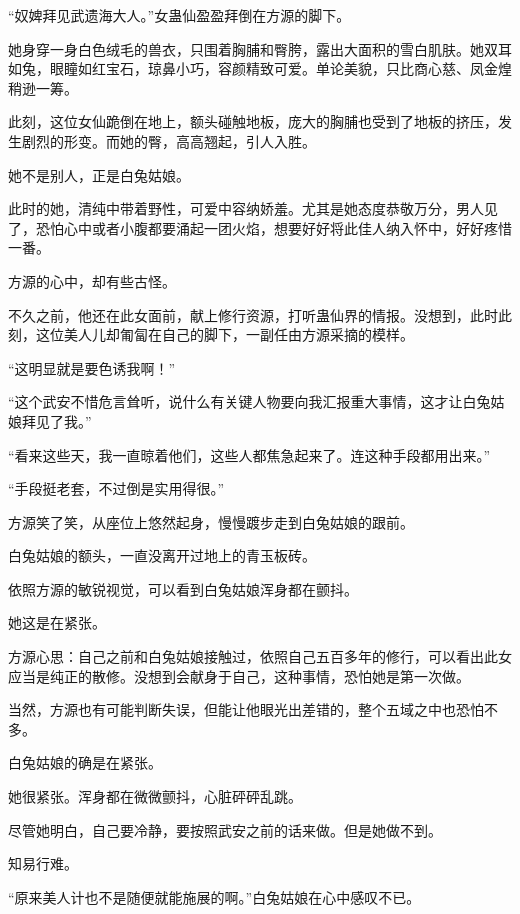 
\begin{this_body}



“奴婢拜见武遗海大人。”女蛊仙盈盈拜倒在方源的脚下。

她身穿一身白色绒毛的兽衣，只围着胸脯和臀胯，露出大面积的雪白肌肤。她双耳如兔，眼瞳如红宝石，琼鼻小巧，容颜精致可爱。单论美貌，只比商心慈、凤金煌稍逊一筹。

此刻，这位女仙跪倒在地上，额头碰触地板，庞大的胸脯也受到了地板的挤压，发生剧烈的形变。而她的臀，高高翘起，引人入胜。

她不是别人，正是白兔姑娘。

此时的她，清纯中带着野性，可爱中容纳娇羞。尤其是她态度恭敬万分，男人见了，恐怕心中或者小腹都要涌起一团火焰，想要好好将此佳人纳入怀中，好好疼惜一番。

方源的心中，却有些古怪。

不久之前，他还在此女面前，献上修行资源，打听蛊仙界的情报。没想到，此时此刻，这位美人儿却匍匐在自己的脚下，一副任由方源采摘的模样。

“这明显就是要色诱我啊！”

“这个武安不惜危言耸听，说什么有关键人物要向我汇报重大事情，这才让白兔姑娘拜见了我。”

“看来这些天，我一直晾着他们，这些人都焦急起来了。连这种手段都用出来。”

“手段挺老套，不过倒是实用得很。”

方源笑了笑，从座位上悠然起身，慢慢踱步走到白兔姑娘的跟前。

白兔姑娘的额头，一直没离开过地上的青玉板砖。

依照方源的敏锐视觉，可以看到白兔姑娘浑身都在颤抖。

她这是在紧张。

方源心思：自己之前和白兔姑娘接触过，依照自己五百多年的修行，可以看出此女应当是纯正的散修。没想到会献身于自己，这种事情，恐怕她是第一次做。

当然，方源也有可能判断失误，但能让他眼光出差错的，整个五域之中也恐怕不多。

白兔姑娘的确是在紧张。

她很紧张。浑身都在微微颤抖，心脏砰砰乱跳。

尽管她明白，自己要冷静，要按照武安之前的话来做。但是她做不到。

知易行难。

“原来美人计也不是随便就能施展的啊。”白兔姑娘在心中感叹不已。


\end{this_body}
